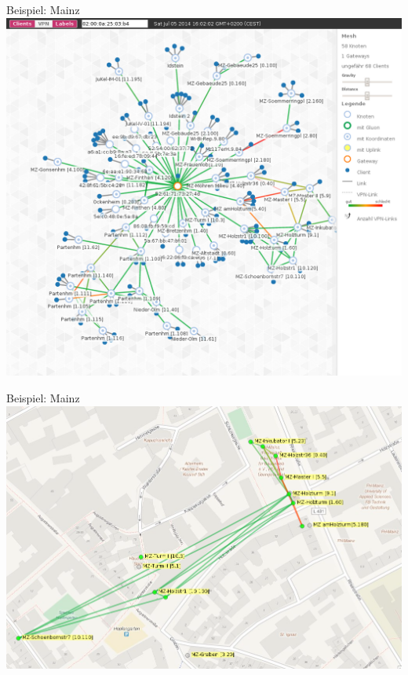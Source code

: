 \documentclass{beamer}
\begin{document}
\begin{frame}{Beispiel: Mainz}
\vfill
\centering
\includegraphics[scale=0.23]{images/mainz-nw}
\vfill
\end{frame}

\begin{frame}{Beispiel: Mainz}
\vfill
\centering
\includegraphics[width=\textwidth]{images/mainz}
\vfill
\end{frame}
\end{document}
